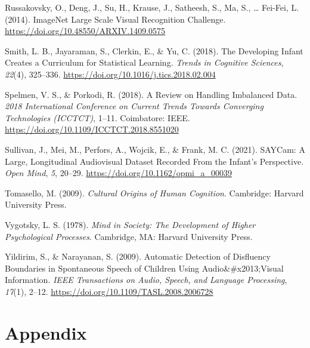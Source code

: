 \documentclass[
  man,floatsintext]{apa6}
\newlength{\cslhangindent}
\newenvironment{CSLReferences}[2] %
 {\begin{list}{}{%
  \setlength{\itemindent}{0pt}
  \setlength{\leftmargin}{0pt}
  \setlength{\parsep}{0pt}
  \ifodd #1
   \setlength{\leftmargin}{\cslhangindent}
   \setlength{\itemindent}{-1\cslhangindent}
  \fi
  \setlength{\itemsep}{#2\baselineskip}}}
 {\end{list}}
\begin{document}
\begin{CSLReferences}{1}{0}
Russakovsky, O., Deng, J., Su, H., Krause, J., Satheesh, S., Ma, S., \ldots{} Fei-Fei, L. (2014). {ImageNet Large Scale Visual Recognition Challenge}. \url{https://doi.org/10.48550/ARXIV.1409.0575}

Smith, L. B., Jayaraman, S., Clerkin, E., \& Yu, C. (2018). The {Developing Infant Creates} a {Curriculum} for {Statistical Learning}. \emph{Trends in Cognitive Sciences}, \emph{22}(4), 325--336. \url{https://doi.org/10.1016/j.tics.2018.02.004}

Spelmen, V. S., \& Porkodi, R. (2018). A {Review} on {Handling Imbalanced Data}. \emph{2018 {International Conference} on {Current Trends} Towards {Converging Technologies} ({ICCTCT})}, 1--11. Coimbatore: IEEE. \url{https://doi.org/10.1109/ICCTCT.2018.8551020}

Sullivan, J., Mei, M., Perfors, A., Wojcik, E., \& Frank, M. C. (2021). {SAYCam}: {A Large}, {Longitudinal Audiovisual Dataset Recorded From} the {Infant}'s {Perspective}. \emph{Open Mind}, \emph{5}, 20--29. \url{https://doi.org/10.1162/opmi_a_00039}

Tomasello, M. (2009). \emph{Cultural {Origins} of {Human Cognition}}. Cambridge: Harvard University Press.

Vygotsky, L. S. (1978). \emph{Mind in {Society}: {The Development} of {Higher Psychological Processes}}. Cambridge, MA: Harvard University Press.

Yildirim, S., \& Narayanan, S. (2009). Automatic {Detection} of {Disfluency Boundaries} in {Spontaneous Speech} of {Children Using Audio}\&\#x2013;{Visual Information}. \emph{IEEE Transactions on Audio, Speech, and Language Processing}, \emph{17}(1), 2--12. \url{https://doi.org/10.1109/TASL.2008.2006728}

\end{CSLReferences}

\endgroup

\newpage

\section{Appendix}\label{appendix}
\end{document}
